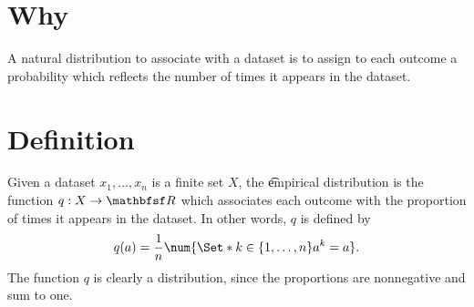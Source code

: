 
\section*{Why}

A natural distribution to associate with a dataset is to assign to each outcome a probability which reflects the number of times it appears in the dataset.

\section*{Definition}

Given a dataset $x_1, \dots , x_n$ is a finite set $X$, the \t{empirical distribution} is the function $q: X \to \R $ which associates each outcome with the proportion of times it appears in the dataset.
In other words, $q$ is defined by
\[
q(a) = \frac{1}{n} \num{\Set*{k \in \set{1, \dots , n}}{a^k = a}}.
\]
The function $q$ is clearly a distribution, since the proportions are nonnegative and sum to one.

\blankpage